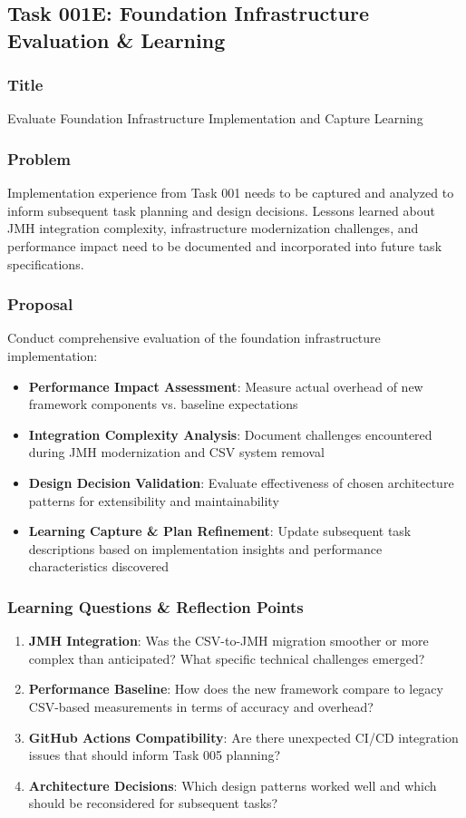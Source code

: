 \documentclass[11pt,a4paper]{article}
\begin{document}
\subsection{Task 001E: Foundation Infrastructure Evaluation \& Learning}

\subsubsection{Title}
Evaluate Foundation Infrastructure Implementation and Capture Learning

\subsubsection{Problem}
Implementation experience from Task 001 needs to be captured and analyzed to inform subsequent task planning and design decisions. Lessons learned about JMH integration complexity, infrastructure modernization challenges, and performance impact need to be documented and incorporated into future task specifications.

\subsubsection{Proposal}
Conduct comprehensive evaluation of the foundation infrastructure implementation:
\begin{itemize}
    \item \textbf{Performance Impact Assessment}: Measure actual overhead of new framework components vs. baseline expectations
    \item \textbf{Integration Complexity Analysis}: Document challenges encountered during JMH modernization and CSV system removal
    \item \textbf{Design Decision Validation}: Evaluate effectiveness of chosen architecture patterns for extensibility and maintainability
    \item \textbf{Learning Capture \& Plan Refinement}: Update subsequent task descriptions based on implementation insights and performance characteristics discovered
\end{itemize}

\subsubsection{Learning Questions \& Reflection Points}
\begin{enumerate}
    \item \textbf{JMH Integration}: Was the CSV-to-JMH migration smoother or more complex than anticipated? What specific technical challenges emerged?
    \item \textbf{Performance Baseline}: How does the new framework compare to legacy CSV-based measurements in terms of accuracy and overhead?
    \item \textbf{GitHub Actions Compatibility}: Are there unexpected CI/CD integration issues that should inform Task 005 planning?
    \item \textbf{Architecture Decisions}: Which design patterns worked well and which should be reconsidered for subsequent tasks?
\end{enumerate}
\end{document}
